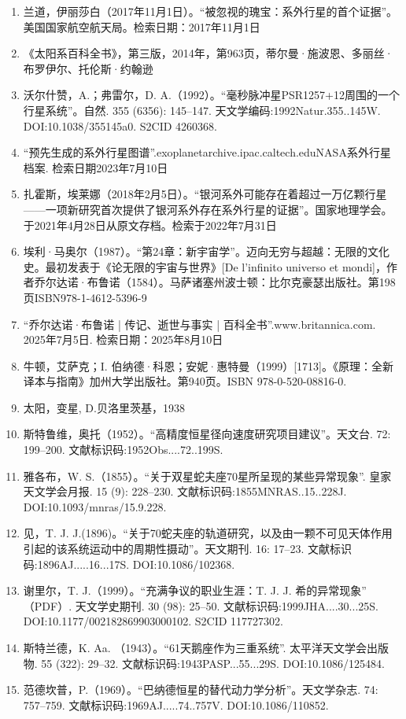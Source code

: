 \begin{enumerate}
\item 兰道，伊丽莎白（2017年11月1日）。“被忽视的瑰宝：系外行星的首个证据”。美国国家航空航天局。检索日期：2017年11月1日
\item 《太阳系百科全书》，第三版，2014年，第963页，蒂尔曼·施波恩、多丽丝·布罗伊尔、托伦斯·约翰逊
\item 沃尔什赞，A.；弗雷尔，D. A.（1992）。“毫秒脉冲星PSR1257+12周围的一个行星系统”。自然. 355 (6356): 145–147. 天文学编码:1992Natur.355..145W. DOI:10.1038/355145a0. S2CID 4260368.
\item “预先生成的系外行星图谱”.exoplanetarchive.ipac.caltech.eduNASA系外行星档案. 检索日期2023年7月10日
\item 扎霍斯，埃莱娜（2018年2月5日）。“银河系外可能存在着超过一万亿颗行星——一项新研究首次提供了银河系外存在系外行星的证据”。国家地理学会。于2021年4月28日从原文存档。检索于2022年7月31日
\item 埃利·马奥尔（1987）。“第24章：新宇宙学”。迈向无穷与超越：无限的文化史。最初发表于《论无限的宇宙与世界》[De l'infinito universo et mondi]，作者乔尔达诺·布鲁诺（1584）。马萨诸塞州波士顿：比尔克豪瑟出版社。第198页ISBN978-1-4612-5396-9
\item “乔尔达诺·布鲁诺 | 传记、逝世与事实 | 百科全书”.www.britannica.com. 2025年7月5日. 检索日期：2025年8月10日
\item 牛顿，艾萨克；I. 伯纳德·科恩；安妮·惠特曼（1999）[1713]。《原理：全新译本与指南》加州大学出版社。第940页。ISBN 978-0-520-08816-0.
\item 太阳，变星, D.贝洛里茨基，1938
\item 斯特鲁维，奥托（1952）。“高精度恒星径向速度研究项目建议”。天文台. 72: 199–200. 文献标识码:1952Obs....72..199S.
\item 雅各布，W. S.（1855）。“关于双星蛇夫座70星所呈现的某些异常现象”. 皇家天文学会月报. 15 (9): 228–230. 文献标识码:1855MNRAS..15..228J. DOI:10.1093/mnras/15.9.228.
\item 见，T. J. J.(1896)。“关于70蛇夫座的轨道研究，以及由一颗不可见天体作用引起的该系统运动中的周期性摄动”。天文期刊. 16: 17–23. 文献标识码:1896AJ.....16...17S. DOI:10.1086/102368.
\item 谢里尔，T. J.（1999）。“充满争议的职业生涯：T. J. J. 希的异常现象” （PDF）. 天文学史期刊. 30 (98): 25–50. 文献标识码:1999JHA....30...25S. DOI:10.1177/002182869903000102. S2CID 117727302.
\item 斯特兰德，K. Aa. （1943）。“61天鹅座作为三重系统”. 太平洋天文学会出版物. 55 (322): 29–32. 文献标识码:1943PASP...55...29S. DOI:10.1086/125484.
\item 范德坎普，P.（1969）。“巴纳德恒星的替代动力学分析”。天文学杂志. 74: 757–759. 文献标识码:1969AJ.....74..757V. DOI:10.1086/110852.

\end{enumerate}
